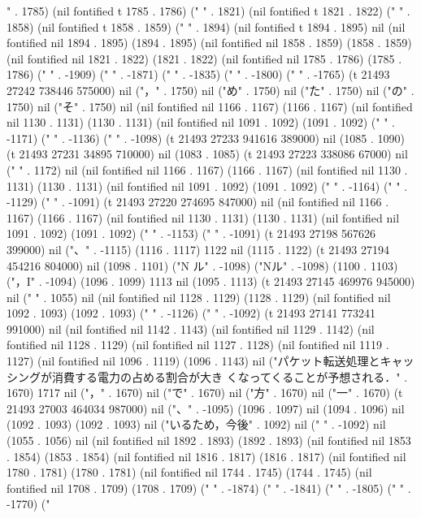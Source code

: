 " . 1785) (nil fontified t 1785 . 1786) ("
" . 1821) (nil fontified t 1821 . 1822) ("
" . 1858) (nil fontified t 1858 . 1859) ("
" . 1894) (nil fontified t 1894 . 1895) nil (nil fontified nil 1894 . 1895) (1894 . 1895) (nil fontified nil 1858 . 1859) (1858 . 1859) (nil fontified nil 1821 . 1822) (1821 . 1822) (nil fontified nil 1785 . 1786) (1785 . 1786) ("
" . -1909) ("
" . -1871) ("
" . -1835) ("
" . -1800) ("
" . -1765) (t 21493 27242 738446 575000) nil ("，" . 1750) nil ("め" . 1750) nil ("た" . 1750) nil ("の" . 1750) nil ("そ" . 1750) nil (nil fontified nil 1166 . 1167) (1166 . 1167) (nil fontified nil 1130 . 1131) (1130 . 1131) (nil fontified nil 1091 . 1092) (1091 . 1092) ("
" . -1171) ("
" . -1136) ("
" . -1098) (t 21493 27233 941616 389000) nil (1085 . 1090) (t 21493 27231 34895 710000) nil (1083 . 1085) (t 21493 27223 338086 67000) nil ("
" . 1172) nil (nil fontified nil 1166 . 1167) (1166 . 1167) (nil fontified nil 1130 . 1131) (1130 . 1131) (nil fontified nil 1091 . 1092) (1091 . 1092) ("
" . -1164) ("
" . -1129) ("
" . -1091) (t 21493 27220 274695 847000) nil (nil fontified nil 1166 . 1167) (1166 . 1167) (nil fontified nil 1130 . 1131) (1130 . 1131) (nil fontified nil 1091 . 1092) (1091 . 1092) ("
" . -1153) ("
" . -1091) (t 21493 27198 567626 399000) nil ("、" . -1115) (1116 . 1117) 1122 nil (1115 . 1122) (t 21493 27194 454216 804000) nil (1098 . 1101) ("N ル" . -1098) ("Nル" . -1098) (1100 . 1103) ("，I" . -1094) (1096 . 1099) 1113 nil (1095 . 1113) (t 21493 27145 469976 945000) nil ("
" . 1055) nil (nil fontified nil 1128 . 1129) (1128 . 1129) (nil fontified nil 1092 . 1093) (1092 . 1093) ("
" . -1126) ("
" . -1092) (t 21493 27141 773241 991000) nil (nil fontified nil 1142 . 1143) (nil fontified nil 1129 . 1142) (nil fontified nil 1128 . 1129) (nil fontified nil 1127 . 1128) (nil fontified nil 1119 . 1127) (nil fontified nil 1096 . 1119) (1096 . 1143) nil ("パケット転送処理とキャッシングが消費する電力の占める割合が大き
くなってくることが予想される．" . 1670) 1717 nil ("，" . 1670) nil ("で" . 1670) nil ("方" . 1670) nil ("一" . 1670) (t 21493 27003 464034 987000) nil ("、" . -1095) (1096 . 1097) nil (1094 . 1096) nil (1092 . 1093) (1092 . 1093) nil ("いるため，今後" . 1092) nil ("
" . -1092) nil (1055 . 1056) nil (nil fontified nil 1892 . 1893) (1892 . 1893) (nil fontified nil 1853 . 1854) (1853 . 1854) (nil fontified nil 1816 . 1817) (1816 . 1817) (nil fontified nil 1780 . 1781) (1780 . 1781) (nil fontified nil 1744 . 1745) (1744 . 1745) (nil fontified nil 1708 . 1709) (1708 . 1709) ("
" . -1874) ("
" . -1841) ("
" . -1805) ("
" . -1770) ("

